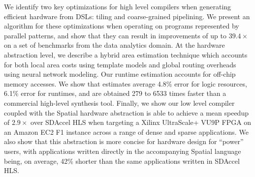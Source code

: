 We identify two key optimizations for high level compilers when
generating efficient hardware from DSLs: tiling and coarse-grained pipelining.
We present an algorithm for these optimizations when operating on programs represented
by parallel patterns, and show that they can result in improvements of up to
$39.4\times$ on a set of benchmarks from the data analytics domain.
At the hardware abstraction level, we describe a hybrid area estimation
technique which accounts for both local area costs using template models
and global routing overheads using neural network modeling.
Our runtime estimation accounts for off-chip memory accesses.
We show that estimates average 4.8\% error for logic resources,
6.1\% error for runtimes, and are obtained 279 to 6533 times faster
than a commercial high-level synthesis tool.
Finally, we show our low level compiler coupled with the Spatial hardware abstraction is
able to achieve a mean speedup of $2.9\times$ over SDAccel HLS when targeting a
Xilinx UltraScale+ VU9P FPGA on an Amazon EC2 F1 instance across a range of
dense and sparse applications.
We also show that this abstraction is more concise for hardware design for
``power'' users, with applications written directly in the
accompanying Spatial language being, on average, 42\% shorter than the
same applications written in SDAccel HLS.
